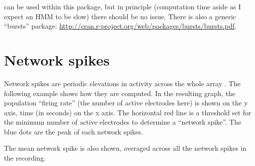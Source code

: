 \documentclass{article}\usepackage[]{graphicx}\usepackage[]{color}
\begin{document}
can be used within this package, but in principle (computation time
aside as I expect an HMM to be slow) there should be no issue.  There
is also a generic ``bursts'' package:
\url{http://cran.r-project.org/web/packages/bursts/bursts.pdf}.



\section*{Network spikes}

Network spikes are periodic elevations in activity across the whole
array \citep{Eytan2006}.  The following example shows how they are computed.
In the resulting graph, the population ``firing rate'' (the number of
active electrodes here) is shown on the y axis, time (in seconds) on
the x axis.  The horizontal red line is a threshold set for the
minimum number of active electrodes to determine a ``network spike''.
The blue dots are the peak of each network spikes.

The mean network spike is also shown, averaged across all the network
spikes in the recording.
\end{document}
